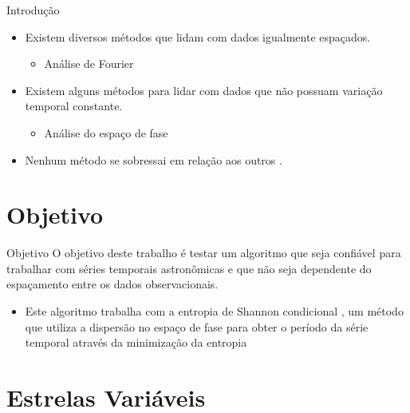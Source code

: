 \documentclass{beamer}
\begin{document}
\begin{frame}[allowframebreaks]{Introdução}
\begin{itemize}
  \item Existem diversos métodos que lidam com dados igualmente espaçados.
    \begin{itemize}
    \item Análise de Fourier \citep{mello81,lomb}
  \end{itemize}
  \item Existem alguns métodos para lidar com dados que não possuam variação temporal constante.
  \begin{itemize}
    \item Análise do espaço de fase \citep{aov,entropy,Cincotta1999,ce}
  \end{itemize}
  \item Nenhum método se sobressai em relação aos outros \citep{comparison}.
\end{itemize}

\end{frame}

\section{Objetivo}

\begin{frame}{Objetivo}
O objetivo deste trabalho é testar um algoritmo que seja confiável para trabalhar com séries temporais astronômicas e que não seja dependente do espaçamento
entre os dados observacionais.
  \begin{itemize}
    \item Este algoritmo trabalha com a entropia de Shannon condicional \citep{Cincotta1999,ce}, um método que utiliza a dispersão no espaço de fase para obter o período da série temporal através da minimização da entropia
  \end{itemize}
\end{frame}


\section{Estrelas Variáveis}
\end{document}
